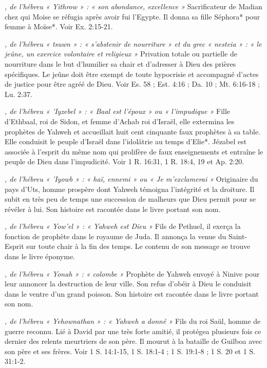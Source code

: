 \begin{multicols}{2}
\textit{, de l'hébreu « Yithrow » : « son abondance, excellence »}\newline
Sacrificateur de Madian chez qui Moise se réfugia après avoir fui l'Egypte. Il donna sa fille Séphora* pour femme à Moïse*. Voir Ex. 2:15-21.

\textit{, de l'hébreu « tsuwn » : « s'abstenir de nourriture » et du grec « nesteia » : « le jeûne, un exercice volontaire et religieux »}\newline
Privation totale ou partielle de nourriture dans le but d'humilier sa chair et d'adresser à Dieu des prières spécifiques. Le jeûne doit être exempt de toute hypocrisie et accompagné d'actes de justice pour être agréé de Dieu. Voir Es. 58 ; Est. 4:16 ; Da. 10 ; Mt. 6:16-18 ; Lu. 2:37.

\textit{, de l'hébreu « 'Iyzebel » : « Baal est l'époux » ou « l'impudique »}\newline
Fille d'Ethbaal, roi de Sidon, et femme d'Achab roi d'Israël, elle extermina les prophètes de Yahweh et accueillait huit cent cinquante faux prophètes à sa table. Elle conduisit le peuple d'Israël dans l'idolâtrie au temps d'Elie*. Jézabel est associée à l'esprit du même nom qui prolifère de faux enseignements et entraîne le peuple de Dieu dans l'impudicité. Voir 1 R. 16:31, 1 R. 18:4, 19 et Ap. 2:20.

\textit{, de l'hébreu « 'Iyowb » : « haï, ennemi » ou « Je m'exclamerai »}\newline
Originaire du pays d'Uts, homme prospère dont Yahweh témoigna l'intégrité et la droiture. Il subit en très peu de temps une succession de malheurs que Dieu permit pour se révéler à lui. Son histoire est racontée dans le livre portant son nom.

\textit{, de l'hébreu « Yow'el » : « Yahweh est Dieu »}\newline
Fils de Pethuel, il exerça la fonction de prophète dans le royaume de Juda. Il annonça la venue du Saint-Esprit sur toute chair à la fin des temps. Le contenu de son message se trouve dans le livre éponyme.

\textit{, de l'hébreu « Yonah » : « colombe »}\newline
Prophète de Yahweh envoyé à Ninive pour leur annoncer la destruction de leur ville. Son refus d'obéir à Dieu le conduisit dans le ventre d'un grand poisson. Son histoire est racontée dans le livre portant son nom.

\textit{, de l'hébreu « Yehownathan » : « Yahweh a donné »}\newline
Fils du roi Saül, homme de guerre reconnu. Lié à David par une très forte amitié, il protégea plusieurs fois ce dernier des relents meurtriers de son père. Il mourut à la bataille de Guilboa avec son père et ses frères. Voir 1 S. 14:1-15, 1 S. 18:1-4 ; 1 S. 19:1-8 ; 1 S. 20 et 1 S. 31:1-2.


\end{multicols}
